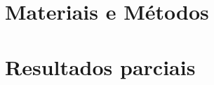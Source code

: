 \documentclass[
	12pt,				%
	oneside,
	a4paper,			%
	english,			%
	french,				%
	spanish,			%
	brazil				%
	]{abntex2}
\begin{document}


\chapter{Materiais e Métodos}
%


\chapter{Resultados parciais}



%
%

%
%
%
%

%
%
\end{document}
